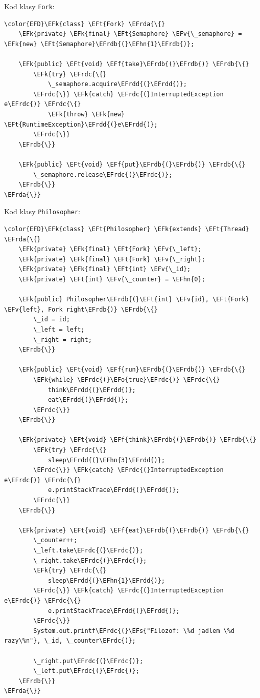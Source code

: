 \documentclass[11pt]{article}
\newcommand{\EFs}[1]{\textcolor{EFs}{#1}} %
\newcommand{\EFk}[1]{\textcolor{EFk}{#1}} %
\newcommand{\EFf}[1]{\textcolor{EFf}{#1}} %
\newcommand{\EFv}[1]{\textcolor{EFv}{#1}} %
\newcommand{\EFt}[1]{\textcolor{EFt}{#1}} %
\newcommand{\EFo}[1]{\textcolor{EFo}{#1}} %
\newcommand{\EFhn}[1]{\textcolor{EFhn}{#1}} %
\newcommand{\EFrda}[1]{\textcolor{EFrda}{#1}} %
\newcommand{\EFrdb}[1]{\textcolor{EFrdb}{#1}} %
\newcommand{\EFrdc}[1]{\textcolor{EFrdc}{#1}} %
\newcommand{\EFrdd}[1]{\textcolor{EFrdd}{#1}} %
\begin{document}
Kod klasy \texttt{Fork}:
\begin{Code}
\begin{Verbatim}
\color{EFD}\EFk{class} \EFt{Fork} \EFrda{\{}
    \EFk{private} \EFk{final} \EFt{Semaphore} \EFv{\_semaphore} = \EFk{new} \EFt{Semaphore}\EFrdb{(}\EFhn{1}\EFrdb{)};

    \EFk{public} \EFt{void} \EFf{take}\EFrdb{(}\EFrdb{)} \EFrdb{\{}
        \EFk{try} \EFrdc{\{}
            \_semaphore.acquire\EFrdd{(}\EFrdd{)};
        \EFrdc{\}} \EFk{catch} \EFrdc{(}InterruptedException e\EFrdc{)} \EFrdc{\{}
            \EFk{throw} \EFk{new} \EFt{RuntimeException}\EFrdd{(}e\EFrdd{)};
        \EFrdc{\}}
    \EFrdb{\}}

    \EFk{public} \EFt{void} \EFf{put}\EFrdb{(}\EFrdb{)} \EFrdb{\{}
        \_semaphore.release\EFrdc{(}\EFrdc{)};
    \EFrdb{\}}
\EFrda{\}}
\end{Verbatim}
\end{Code}

Kod klasy \texttt{Philosopher}:
\begin{Code}
\begin{Verbatim}
\color{EFD}\EFk{class} \EFt{Philosopher} \EFk{extends} \EFt{Thread} \EFrda{\{}
    \EFk{private} \EFk{final} \EFt{Fork} \EFv{\_left};
    \EFk{private} \EFk{final} \EFt{Fork} \EFv{\_right};
    \EFk{private} \EFk{final} \EFt{int} \EFv{\_id};
    \EFk{private} \EFt{int} \EFv{\_counter} = \EFhn{0};

    \EFk{public} Philosopher\EFrdb{(}\EFt{int} \EFv{id}, \EFt{Fork} \EFv{left}, Fork right\EFrdb{)} \EFrdb{\{}
        \_id = id;
        \_left = left;
        \_right = right;
    \EFrdb{\}}

    \EFk{public} \EFt{void} \EFf{run}\EFrdb{(}\EFrdb{)} \EFrdb{\{}
        \EFk{while} \EFrdc{(}\EFo{true}\EFrdc{)} \EFrdc{\{}
            think\EFrdd{(}\EFrdd{)};
            eat\EFrdd{(}\EFrdd{)};
        \EFrdc{\}}
    \EFrdb{\}}

    \EFk{private} \EFt{void} \EFf{think}\EFrdb{(}\EFrdb{)} \EFrdb{\{}
        \EFk{try} \EFrdc{\{}
            sleep\EFrdd{(}\EFhn{3}\EFrdd{)};
        \EFrdc{\}} \EFk{catch} \EFrdc{(}InterruptedException e\EFrdc{)} \EFrdc{\{}
            e.printStackTrace\EFrdd{(}\EFrdd{)};
        \EFrdc{\}}
    \EFrdb{\}}

    \EFk{private} \EFt{void} \EFf{eat}\EFrdb{(}\EFrdb{)} \EFrdb{\{}
        \_counter++;
        \_left.take\EFrdc{(}\EFrdc{)};
        \_right.take\EFrdc{(}\EFrdc{)};
        \EFk{try} \EFrdc{\{}
            sleep\EFrdd{(}\EFhn{1}\EFrdd{)};
        \EFrdc{\}} \EFk{catch} \EFrdc{(}InterruptedException e\EFrdc{)} \EFrdc{\{}
            e.printStackTrace\EFrdd{(}\EFrdd{)};
        \EFrdc{\}}
        System.out.printf\EFrdc{(}\EFs{"Filozof: \%d jadlem \%d razy\%n"}, \_id, \_counter\EFrdc{)};

        \_right.put\EFrdc{(}\EFrdc{)};
        \_left.put\EFrdc{(}\EFrdc{)};
    \EFrdb{\}}
\EFrda{\}}
\end{Verbatim}
\end{Code}
\end{document}
